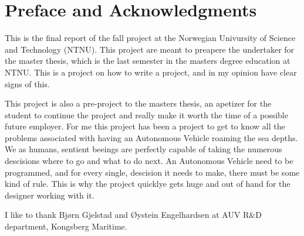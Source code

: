 \chapter{Preface and Acknowledgments}
	This is the final report of the fall project at the Norwegian Univursity of Science and Technology
	(NTNU). This project are meant to preapere the
	undertaker for the master thesis, which is the last semester in the masters degree education at NTNU.
	This is a project on how to write a project, and in my opinion have clear signs of this. 

	This project is also a pre-project to the masters thesis, an apetizer for the student to continue the
	project and really make it worth the time of a possible future employer. For me this project has been
	a project to get to know all the problems associated with having an Autonomous Vehicle roaming the sea
	depths. We as humans, sentient beeings are perfectly capable of taking the numerous descisions where
	to go and what to do next. An Autonomous Vehicle need to be programmed, and for every single,
	descision it needs to make, there must be some kind of rule. This is why the project quicklye gets
	huge and out of hand for the designer working with it. 

	
	I like to thank Bjørn Gjelstad and Øystein Engelhardsen at AUV R\&D department, Kongsberg Maritime.




